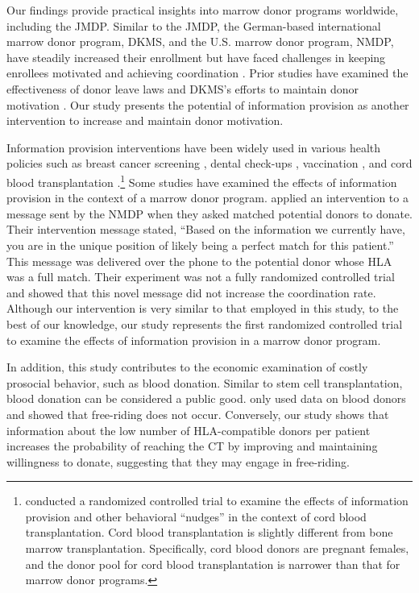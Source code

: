\documentclass[12pt, a4paper]{article}
\begin{document}
Our findings provide practical insights into marrow donor programs worldwide, including the JMDP. Similar to the JMDP, the German-based international marrow donor program, DKMS, and the U.S. marrow donor program, NMDP, have steadily increased their enrollment but have faced challenges in keeping enrollees motivated and achieving coordination \citep{Switzer1999, Switzer2004, Haylock2024}. Prior studies have examined the effectiveness of donor leave laws \citep{Lacetera2014} and DKMS's efforts to maintain donor motivation \citep{Haylock2024}. Our study presents the potential of information provision as another intervention to increase and maintain donor motivation.

Information provision interventions have been widely used in various health policies such as breast cancer screening \citep{Bertoni2020}, dental check-ups \citep{Altmann2014}, vaccination \citep[e.g.,][]{Dai2021, Milkman2021}, and cord blood transplantation \citep{Grieco2018}.\footnote{\citet{Grieco2018} conducted a randomized controlled trial to examine the effects of information provision and other behavioral ``nudges'' in the context of cord blood transplantation. Cord blood transplantation is slightly different from bone marrow transplantation. Specifically, cord blood donors are pregnant females, and the donor pool for cord blood transplantation is narrower than that for marrow donor programs.} Some studies have examined the effects of information provision in the context of a marrow donor program. \citet{Switzer2018} applied an intervention to a message sent by the NMDP when they asked matched potential donors to donate. Their intervention message stated, ``Based on the information we currently have, you are in the unique position of likely being a perfect match for this patient.'' This message was delivered over the phone to the potential donor whose HLA was a full match. Their experiment was not a fully randomized controlled trial and showed that this novel message did not increase the coordination rate. Although our intervention is very similar to that employed in this study, to the best of our knowledge, our study represents the first randomized controlled trial to examine the effects of information provision in a marrow donor program.

In addition, this study contributes to the economic examination of costly prosocial behavior, such as blood donation. Similar to stem cell transplantation, blood donation can be considered a public good. \citet{Wildman2009} only used data on blood donors and showed that free-riding does not occur. Conversely, our study shows that information about the low number of HLA-compatible donors per patient increases the probability of reaching the CT by improving and maintaining willingness to donate, suggesting that they may engage in free-riding.
\end{document}
